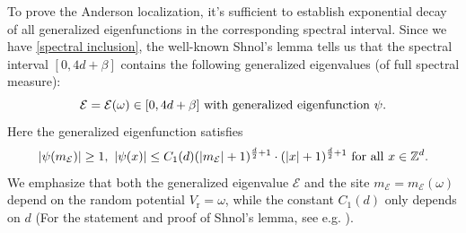 \documentclass[11pt,reqno,UTF8,twoside]{amsart}
\newcommand{\Z}{\mathbb{Z}}
\newcommand{\mcE}{\mathcal{E}}
\theoremstyle{definition}
\numberwithin{equation}{section}
\begin{document}
To prove the Anderson localization, it's sufficient to establish exponential decay of all generalized eigenfunctions in the corresponding spectral interval. Since we have \eqref{spectral inclusion}, the well-known Shnol's lemma tells us that the spectral interval  $[0,4d+\beta]$ contains  the following generalized eigenvalues (of  full spectral measure): 
\begin{equation}\label{generalized eigenvalue}
  \mcE=\mcE(\omega)\in [0,4d+\beta] \ {\rm with\ generalized \ eigenfunction \ } \psi.
\end{equation}
Here the generalized eigenfunction satisfies 
\begin{equation}\label{generalized eigenfunction}
  |\psi(m_{\mcE})| \geq 1, \ |\psi(x)|\leq C_1(d) (|m_{\mcE}|+1)^{\frac{d}{2}+1}\cdot (|x|+1)^{\frac{d}{2}+1} \ {\rm for \ all\ } x\in \Z^d. 
\end{equation}
We emphasize that both  the generalized eigenvalue $\mcE$ and the site $m_{\mcE}=m_{\mcE}(\omega)$ depend on the random potential $V_{\text{r}}=\omega$, while the constant $C_1(d)$ only depends on  $d$ (For the statement and proof of Shnol's lemma, see e.g. \cite[Proposition 7.4]{Kir08}). 
\end{document}
